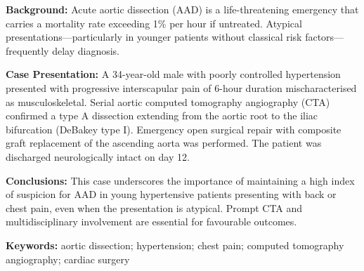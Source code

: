 \documentclass[11pt,a4paper]{article}
\begin{document}
\begin{abstractbox}
\textbf{Background:}
Acute aortic dissection (AAD) is a life-threatening emergency that carries a mortality rate
exceeding 1\% per hour if untreated. Atypical presentations—particularly in younger patients
without classical risk factors—frequently delay diagnosis.

\smallskip
\textbf{Case Presentation:}
A 34-year-old male with poorly controlled hypertension presented with progressive interscapular
pain of 6-hour duration mischaracterised as musculoskeletal. Serial aortic computed tomography
angiography (CTA) confirmed a type A dissection extending from the aortic root to the
iliac bifurcation (DeBakey type I). Emergency open surgical repair with composite graft
replacement of the ascending aorta was performed. The patient was discharged neurologically
intact on day 12.

\smallskip
\textbf{Conclusions:}
This case underscores the importance of maintaining a high index of suspicion for AAD in young
hypertensive patients presenting with back or chest pain, even when the presentation is
atypical. Prompt CTA and multidisciplinary involvement are essential for favourable outcomes.

\smallskip
\textbf{Keywords:}
aortic dissection; hypertension; chest pain; computed tomography angiography; cardiac surgery
\end{abstractbox}

\vspace{6pt}









\end{document}
